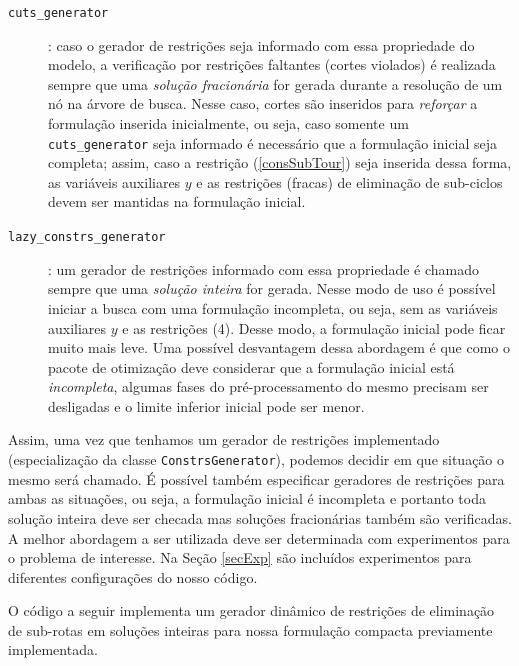 \documentclass[a4paper,11pt,fleqn]{article}
\begin{document}
\begin{description}
	\item[\texttt{cuts\_generator}]: caso o gerador de restrições seja informado com essa propriedade do modelo, a verificação por restrições faltantes (cortes violados) é realizada sempre que uma \emph{solução fracionária} for gerada durante a resolução de um nó na árvore de busca. Nesse caso, cortes são inseridos para \emph{reforçar} a formulação inserida inicialmente, ou seja, caso somente um \texttt{cuts\_generator} seja informado é necessário que a formulação inicial seja completa; assim, caso a restrição (\ref{consSubTour}) seja inserida dessa forma, as variáveis auxiliares $y$ e as restrições (fracas) de eliminação de sub-ciclos devem ser mantidas na formulação inicial.
	
	\item[\texttt{lazy\_constrs\_generator}]: um gerador de restrições informado com essa propriedade é chamado sempre que uma \emph{solução inteira} for gerada. Nesse modo de uso é possível iniciar a busca com uma formulação incompleta, ou seja, sem as variáveis auxiliares $y$ e as restrições (4). Desse modo, a formulação inicial pode ficar muito mais leve. Uma possível desvantagem dessa abordagem é que como o pacote de otimização deve considerar que a formulação inicial está \emph{incompleta}, algumas fases do pré-processamento do mesmo precisam ser desligadas e o limite inferior inicial pode ser menor.
\end{description}

Assim, uma vez que tenhamos um gerador de restrições implementado (especialização da classe \texttt{ConstrsGenerator}), podemos decidir em que situação o mesmo será chamado. 
É possível também especificar geradores de restrições para ambas as situações, ou seja, a formulação inicial é incompleta e portanto toda solução inteira deve ser checada mas soluções fracionárias também são verificadas. 
A melhor abordagem a ser utilizada deve ser determinada com experimentos para o problema de interesse. 
Na Seção \ref{secExp} são incluídos experimentos para diferentes configurações do nosso código.

O código a seguir implementa um gerador dinâmico de restrições de eliminação de sub-rotas em soluções inteiras para nossa formulação compacta previamente implementada. 
\end{document}

